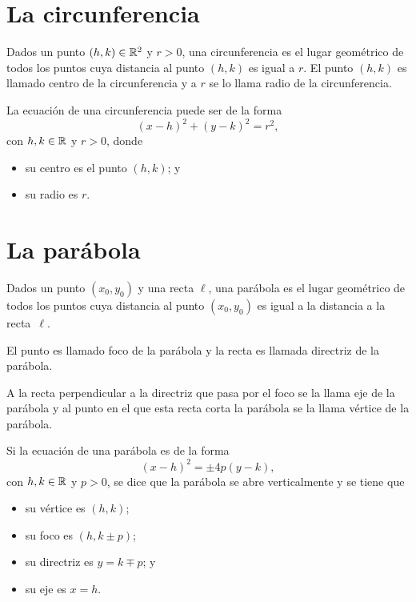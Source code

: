 \documentclass[a4,11pt]{aleph-notas}
\begin{document}
\section{La circunferencia}

\begin{defi}[Circunferencia]
    Dados un punto $(h,k)\in\mathbb{R}^2$ y $r>0$, una circunferencia es el lugar geométrico de todos los puntos cuya distancia al punto $(h,k)$ es igual a $r$. El punto $(h,k)$ es llamado centro de la circunferencia y a $r$ se lo llama radio de la circunferencia.
\end{defi}

\begin{teo}
    La ecuación de una circunferencia puede ser de la forma
    \[
        (x-h)^2 + (y-k)^2 = r^2,
    \]
    con $h,k\in\mathbb{R}$ y $r>0$, donde
    \begin{itemize}
    \item 
        su centro es el punto $(h,k)$; y
    \item   
        su radio es $r$.
    \end{itemize}
\end{teo}


\section{La parábola}

\begin{defi}[Parábola]
    Dados un punto $(x_0,y_0)$ y una recta $\ell$, una parábola es el lugar geométrico de todos los puntos cuya distancia al punto $(x_0,y_0)$ es igual a la distancia a la recta~$\ell$. 
    
    El punto es llamado foco de la parábola y la recta es llamada directriz de la parábola.
    
    A la recta perpendicular a la directriz que pasa por el foco se la llama eje de la parábola y al punto en el que esta recta corta la parábola se la llama vértice de la parábola.
\end{defi}


\begin{teo}
    Si la ecuación de una parábola es de la forma 
    \[
        (x-h)^2=\pm4p(y-k),
    \]
    con $h,k\in\mathbb{R}$ y $p>0$, se dice que la parábola se abre  verticalmente y se tiene que
    \begin{multicols}{2}
    \begin{itemize}
        \item su vértice es $(h,k)$;
        \item su foco es $(h,k\pm p)$;
        \item su directriz es $y=k\mp p$; y
        \item su eje es $x=h$.
    \end{itemize}
    \end{multicols}
\end{teo}
\end{document}
